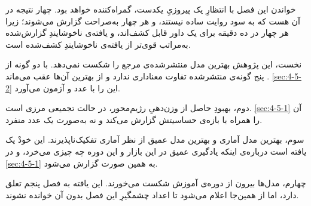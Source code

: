 خواندن این فصل با انتظارِ یک پیروزیِ یکدست، گمراه‌کننده خواهد بود. چهار نتیجه در آن
هست که به سود روایت ساده نیستند، و هر چهار به‌صراحت گزارش می‌شوند؛ زیرا هر چهار در
ده دقیقه برای یک داور قابل کشف‌اند، و یافته‌ی ناخوشایندِ گزارش‌شده به‌مراتب قوی‌تر از
یافته‌ی ناخوشایندِ کشف‌شده است.

نخست، این پژوهش بهترین مدل منتشرشده‌ی مرجع را شکست نمی‌دهد. با دو گونه از پنج گونه‌ی
منتشرشده تفاوت معناداری ندارد و از بهترین آن‌ها عقب می‌ماند
\cite{lago_forecasting_2021}. \cref{sec:4-5-2} این را با عدد و آزمون می‌آورد.

دوم، بهبودِ حاصل از وزن‌دهیِ رژیم‌محور، در حالت تجمیعی مرزی است. \cref{sec:4-5-1} آن را
همراه با بازه‌ی حساسیتش گزارش می‌کند و نه به‌صورت یک عدد منفرد.

سوم، بهترین مدل آماری و بهترین مدل عمیق از نظر آماری تفکیک‌ناپذیرند. این خودْ یک
یافته است درباره‌ی اینکه یادگیری عمیق در این بازار و این دوره چه چیزی می‌خرد، و در \cref{sec:4-5-1} به همین صورت گزارش می‌شود.

چهارم، مدل‌ها بیرون از دوره‌ی آموزش شکست می‌خورند. این یافته به فصل پنجم تعلق دارد، اما
از همین‌جا اعلام می‌شود تا اعداد چشمگیرِ این فصل بدون آن خوانده نشوند.
